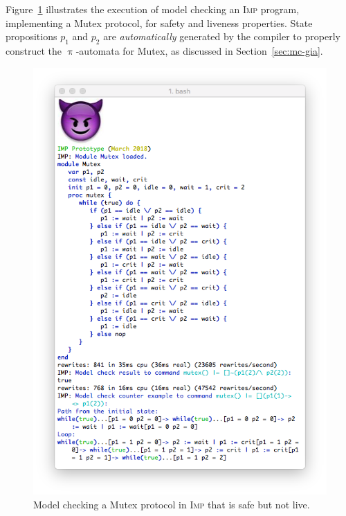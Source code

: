 \documentclass{llncs}%
\begin{document}
Figure~\ref{fig:imp-mutex} illustrates the execution of model checking an \textsc{Imp} program, implementing a Mutex protocol, for safety and liveness properties.  State propositions $p_1$ and $p_2$ are \emph{automatically} generated by the compiler to properly construct the $\uppi$-automata for Mutex, as discussed in Section~\ref{sec:mc-gia}.
\begin{figure}
\begin{center} \includegraphics[width=\columnwidth]{imp-mutex.png} \end{center}
\caption{Model checking a Mutex protocol in \textsc{Imp} that is safe but not live.}
\label{fig:imp-mutex}
\end{figure}


\end{document}
